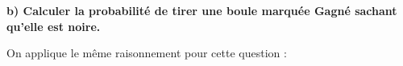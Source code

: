 \documentclass[12pt]{article}
\begin{document}
\vspace{0.5cm}
{\color{black!30}\dotfill}

\vspace{0.5cm}
{\color{black!30}\dotfill}

\vspace{20pt}
\textbf{b) Calculer la probabilité de tirer une boule marquée Gagné sachant qu'elle est noire.}

\vspace{5pt}
On applique le même raisonnement pour cette question : 

\vspace{0.5cm}
{\color{black!30}\dotfill}

\vspace{0.5cm}
{\color{black!30}\dotfill}

\vspace{0.5cm}
{\color{black!30}\dotfill}

\vspace{0.5cm}
{\color{black!30}\dotfill}

\vspace{0.5cm}
{\color{black!30}\dotfill}

\vspace{0.5cm}
{\color{black!30}\dotfill}

\vspace{20pt}
\end{document}
